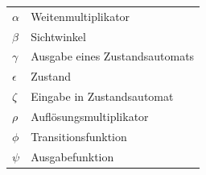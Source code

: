 \documentclass[12pt,a4paper,oneside,numbers=noenddot,headsepline,captions=tableheading,toc=bibliography,openany,tikz,margin=5mm]{scrbook}
\begin{document}
\begin{longtable}{p{3cm}p{8cm}}
		$\alpha$&Weitenmultiplikator\\
		$\beta$&Sichtwinkel\\
		$\gamma$&Ausgabe eines Zustandsautomats\\
		$\epsilon$&Zustand\\
		$\zeta$&Eingabe in Zustandsautomat\\
		$\rho$&Auflösungsmultiplikator\\	
		$\phi$&Transitionsfunktion\\
		$\psi$&Ausgabefunktion\\ \hline
		
		
		\bottomrule
	\end{longtable}
	
	
	
	\cleardoublepage
	\pagestyle{headings}
	\setlength{\parskip}{0.1em}
	
	
	
	
	
	\clearpage
	
	\printbibliography[title={Quellenverzeichnis}]
	\clearpage
	
\end{document}
